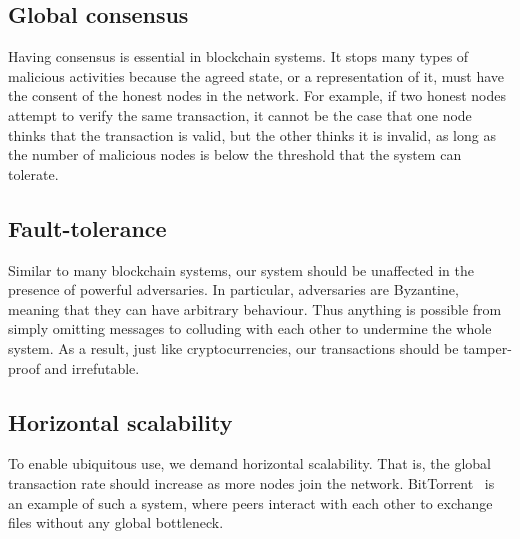 \subsection*{Global consensus}
Having consensus is essential in blockchain systems.
It stops many types of malicious activities because the agreed state,
or a representation of it, must have the consent of the honest nodes in the network.
For example, if two honest nodes attempt to verify the same transaction,
it cannot be the case that one node thinks that the transaction is valid, but the other thinks it is invalid,
as long as the number of malicious nodes is below the threshold that the system can tolerate.

\subsection*{Fault-tolerance}
Similar to many blockchain systems,
our system should be unaffected in the presence of powerful adversaries.
In particular, adversaries are Byzantine,
meaning that they can have arbitrary behaviour.
Thus anything is possible from simply omitting messages to colluding with each other to undermine the whole system.
As a result, just like cryptocurrencies, our transactions should be tamper-proof and irrefutable.

\subsection*{Horizontal scalability}

To enable ubiquitous use, we demand horizontal scalability.
That is, the global transaction rate should increase as more nodes join the network.
BitTorrent~\cite{cohen2003incentives} is an example of such a system,
where peers interact with each other to exchange files without any global bottleneck.

